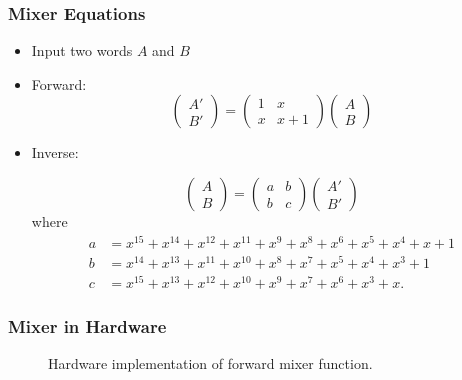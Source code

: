 \begin{frame}
\frametitle{Mixer Equations}
\begin{itemize}
  \item Input two words $A$ and $B$
  \item Forward:
  \begin{equation*}
  \begin{pmatrix}
  A' \\ B'
  \end{pmatrix}
  =
  \begin{pmatrix}
  1 & x \\ x & x + 1
  \end{pmatrix}
  \begin{pmatrix}
  A \\ B
  \end{pmatrix}
  \end{equation*}
  
  \item Inverse: 

\begin{equation*}
\begin{pmatrix}
A \\ B
\end{pmatrix}
=
\begin{pmatrix}
a & b \\ b & c
\end{pmatrix}
\begin{pmatrix}
A' \\ B'
\end{pmatrix}
\end{equation*}
where
\begin{align*}
a &= x^{15} + x^{14} + x^{12} + x^{11} + x^9 + x^8 + x^6 + x^5 + x^4 + x + 1 \\
b &= x^{14} + x^{13} + x^{11} + x^{10} + x^8 + x^7 + x^5 + x^4 + x^3 + 1 \\
c &= x^{15} + x^{13} + x^{12} + x^{10} + x^9 + x^7 + x^6 + x^3 + x.
\end{align*}
\end{itemize}
\end{frame}

\begin{frame}
\frametitle{Mixer in Hardware}
\begin{figure}[ht]
\centering

\caption{Hardware implementation of forward mixer function.}
\end{figure}
\end{frame}

